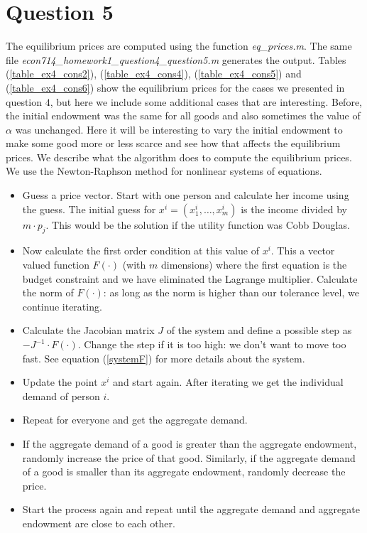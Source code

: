 \documentclass[a4paper,12pt]{article}
\begin{document}
    
    
    
    \medskip
    \medskip
    \section*{Question 5}   
    \medskip
    
    The equilibrium prices are computed using the function \textit{eq\_prices.m}. The same file \textit{econ714\_homework1\_question4\_question5.m} generates the output. Tables (\ref{table_ex4_cons2}), (\ref{table_ex4_cons4}), (\ref{table_ex4_cons5}) and (\ref{table_ex4_cons6}) show the equilibrium prices for the cases we presented in question $4$, but here we include some additional cases that are interesting. Before, the initial endowment was the same for all goods and also sometimes the value of $\alpha$ was unchanged. Here it will be interesting to vary the initial endowment to make some good more or less scarce and see how that affects the equilibrium prices. We describe what the algorithm does to compute the equilibrium prices. We use the Newton-Raphson method for nonlinear systems of equations. 
    
    \begin{itemize}
        \item Guess a price vector. Start with one person and calculate her income using the guess. The initial guess for $x^i=(x^i_1,\dots, x^i_m)$ is the income divided by $m\cdot p_j$. This would be the solution if the utility function was Cobb Douglas. 
        \item Now calculate the first order condition at this value of $x^i$. This a vector valued function $F(\cdot)$ (with $m$ dimensions) where the first equation is the budget constraint and we have eliminated the Lagrange multiplier. Calculate the norm of $F(\cdot)$: as long as the norm is higher than our tolerance level, we continue iterating. 
        \item Calculate the Jacobian matrix $J$ of the system and define a possible step as $-J^{-1}\cdot F(\cdot)$. Change the step if it is too high: we don't want to move too fast. See equation (\ref{systemF}) for more details about the system. 
        
        \item Update the point $x^i$ and start again. After iterating we get the individual demand of person $i$. 
        
        \item Repeat for everyone and get the aggregate demand. 
        
        \item If the aggregate demand of a good is greater than the aggregate endowment, randomly increase the price of that good. Similarly, if the aggregate demand of a good is smaller than its aggregate endowment, randomly decrease the price. 
        
        \item Start the process again and repeat until the aggregate demand and aggregate endowment are close to each other. 
    \end{itemize}
    
\end{document}

